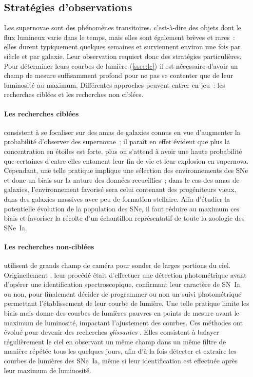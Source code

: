 \documentclass[../main/main.tex]{subfiles}
\begin{document}
\subsection{Stratégies d'observations}\label{ssec:startobs}

Les supernovae sont des phénomènes transitoires, c'est-à-dire des objets dont le
flux lumineux varie dans le temps, mais elles sont également brèves et rares~:
elles durent typiquement quelques semaines et surviennent environ une fois par
siècle et par galaxie. Leur observation requiert donc des stratégies
particulières. Pour déterminer leurs courbes de lumière (\ref{ssec:lc}) il est
nécessaire d'avoir un champ de mesure suffisamment profond pour ne pas se
contenter que de leur luminosité au maximum. Différentes approches peuvent
entrer en jeu~: les recherches ciblées et les recherches non ciblées.

\paragraph*{Les recherches ciblées} consistent à se focaliser sur des amas de
galaxies connus en vue d'augmenter la probabilité d'observer des supernovae~; il
paraît en effet évident que plus la concentration en étoiles est forte, plus on
s'attend à avoir une haute probabilité que certaines d'entre elles entament leur
fin de vie et leur explosion en supernova. Cependant, une telle pratique
implique une sélection des environnements des SNe et donc un biais sur la nature
des données recueillies~; dans le cas des amas de galaxies, l'environnement
favorisé sera celui contenant des progéniteurs vieux, dans des galaxies massives
avec peu de formation stellaire. Afin d'étudier la potentielle évolution de la
population des SNe, il faut réduire au maximum ces biais et favoriser la récolte
d'un échantillon représentatif de toute la zoologie des SNe~Ia.

\paragraph*{Les recherches non-ciblées} utilisent de grands champ de caméra pour
sonder de larges portions du ciel. Originellement
\citep[SCP,][]{perlmutter1999}, leur procédé était d'effectuer une
détection photométrique avant d'opérer une identification spectroscopique,
confirmant leur caractère de SN~Ia ou non, pour finalement décider de programmer
ou non un suivi photométrique permettant l'établissement de leur courbe de
lumière. Une telle pratique limite les biais mais donne des courbes de lumières
pauvres en points de mesure avant le maximum de luminosité, impactant
l'ajustement des courbes. Ces méthodes ont évolué pour devenir des recherches
\textit{glissantes} \citep{astier2006}. Elles consistent à balayer régulièrement
le ciel en observant un même champ dans un même filtre de manière répétée tous
les quelques jours, afin d'à la fois détecter et extraire les courbes de
lumières des SNe~Ia, même si leur identification est effectuée après leur
maximum de luminosité.
\end{document}
